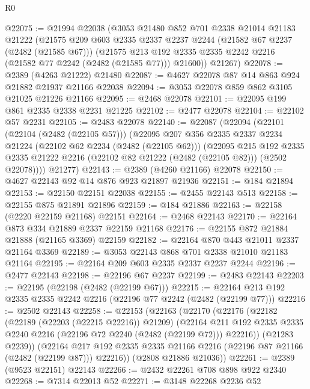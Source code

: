 \begin{lexlean}{R0}
\begin{coremodule}
@22075 := @21994
    @22038
    (@3053
      @21480
      @852
      @701
      @2338
      @21014
      @21183
      @21222
      (@21575
        @209
        @603
        @2335
        @2337
        @2237
        @2244
        (@21582 @67 @2237 (@2482 (@21585 @67)))
        (@21575 @213 @192 @2335 @2335 @2242 @2216 (@21582 @77 @2242 (@2482 (@21585 @77))) @21600))
      @21267)
@22078 := @2389 (@4263 @21222) @21480
@22087 := @4627 @22078 @87 @14 @863 @924 @21882 @21937 @21166 @22038
@22094 := @3053 @22078 @859 @862 @3105 @21025 @21226 @21166
@22095 := @2468 @22078
@22101 := @22095 @199 @861 @2335 @2338 @2231 @21225
@22102 := @2477 @22078
@22104 := @22102 @57 @2231
@22105 := @2483 @22078
@22140 := @22087
    (@22094
      (@22101
        (@22104 (@2482 (@22105 @57)))
        (@22095
          @207
          @356
          @2335
          @2337
          @2234
          @21224
          (@22102 @62 @2234 (@2482 (@22105 @62)))
          (@22095
            @215
            @192
            @2335
            @2335
            @21222
            @2216
            (@22102 @82 @21222 (@2482 (@22105 @82)))
            (@2502 @22078))))
      @21277)
@22143 := @2389 (@4260 @21166) @22078
@22150 := @4627 @22143 @92 @14 @876 @923 @21897 @21936
@22151 := @184 @21894
@22153 := @22150 @22151 @22038
@22155 := @2455 @22143 @513
@22158 := @22155 @875 @21891 @21896
@22159 := @184 @21886
@22163 := @22158 (@2220 @22159 @21168) @22151
@22164 := @2468 @22143
@22170 := @22164 @873 @334 @21889 @2337 @22159 @21168
@22176 := @22155 @872 @21884 @21888 (@21165 @3369) @22159
@22182 := @22164 @870 @443 @21011 @2337 @21164 @3369
@22189 := @3053 @22143 @868 @701 @2338 @21010 @21183 @21164
@22195 := @22164 @209 @603 @2335 @2337 @2237 @2244
@22196 := @2477 @22143
@22198 := @22196 @67 @2237
@22199 := @2483 @22143
@22203 := @22195 (@22198 (@2482 (@22199 @67)))
@22215 := @22164 @213 @192 @2335 @2335 @2242 @2216 (@22196 @77 @2242 (@2482 (@22199 @77)))
@22216 := @2502 @22143
@22258 := @22153
    (@22163
      (@22170
        (@22176
          (@22182
            (@22189 (@22203 (@22215 @22216)) @21209)
            (@22164
              @211
              @192
              @2335
              @2335
              @2240
              @2216
              (@22196 @72 @2240 (@2482 (@22199 @72)))
              @22216))
          (@21283 @2239))
        (@22164 @217 @192 @2335 @2335 @21166 @2216 (@22196 @87 @21166 (@2482 (@22199 @87))) @22216))
      (@2808 @21886 @21036))
@22261 := @2389 (@9523 @22151) @22143
@22266 := @2432 @22261 @708 @898 @922 @2340
@22268 := @7314 @22013 @52
@22271 := @3148 @22268 @2236 @52

\end{coremodule}
\end{lexlean}
